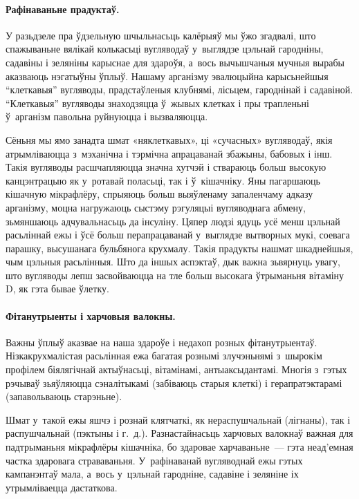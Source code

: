 \paragraph{Рафінаваньне прадуктаў.}
У разьдзеле пра ўдзельную шчыльнасьць калёрыяў мы ўжо згадвалі, што спажываньне вялікай колькасьці вугляводаў у~выглядзе цэльнай гародніны, садавіны і зеляніны карыснае для здароўя, а~вось вычышчаныя мучныя вырабы аказваюць нэгатыўны ўплыў. Нашаму арганізму эвалюцыйна карысьнейшыя ``клеткавыя'' вугляводы, прадстаўленыя клубнямі, лісьцем, гароднінай і садавіной. ``Клеткавыя'' вугляводы знаходзяцца ў~жывых клетках і пры трапленьні ў~арганізм павольна руйнуюцца і вызваляюцца.

Сёньня мы ямо занадта шмат «няклеткавых», ці «сучасных» вугляводаў, якія атрымліваюцца з~мэханічна і тэрмічна апрацаванай збажыны, бабовых і інш. Такія вугляводы расшчапляюцца значна хутчэй і ствараюць больш высокую канцэнтрацыю як у~ротавай поласьці, так і ў~кішачніку. Яны пагаршаюць кішачную мікрафлёру, спрыяюць больш выяўленаму запаленчаму адказу арганізму, моцна нагружаюць сыстэму рэгуляцыі вугляводнага абмену, зьмяншаюць адчувальнасьць да інсуліну. Цяпер людзі ядуць усё менш цэльнай расьліннай ежы і ўсё больш перапрацаванай у~выглядзе вытворных мукі, соевага парашку, высушанага бульбянога крухмалу. Такія прадукты нашмат шкаднейшыя, чым цэльныя расьлінныя. Што да іншых аспэктаў, дык важна зьвярнуць увагу, што вугляводы лепш засвойваюцца на тле больш высокага ўтрыманьня вітаміну D, як гэта бывае ўлетку.

\paragraph{Фітанутрыенты і харчовыя валокны.}
Важны ўплыў аказвае на наша здароўе і недахоп розных фітанутрыентаў. Нізкакрухмалістая расьлінная ежа багатая рознымі злучэньнямі з~шырокім профілем біялягічнай актыўнасьці, вітамінамі, антыаксыдантамі. Многія з~гэтых рэчываў зьяўляюцца сэналітыкамі (забіваюць старыя клеткі) і герапратэктарамі (запавольваюць старэньне).

Шмат у~такой ежы яшчэ і рознай клятчаткі, як нераспушчальнай (лігнаны), так і распушчальнай (пэктыны і г.~д.). Разнастайнасьць харчовых валокнаў важная для падтрыманьня мікрафлёры кішачніка, бо здаровае харчаваньне~--- гэта неад'емная частка здаровага страваваньня. У~рафінаванай вугляводнай ежы гэтых кампанэнтаў мала, а~вось у~цэльнай гародніне, садавіне і зеляніне іх утрымліваецца дастаткова.

